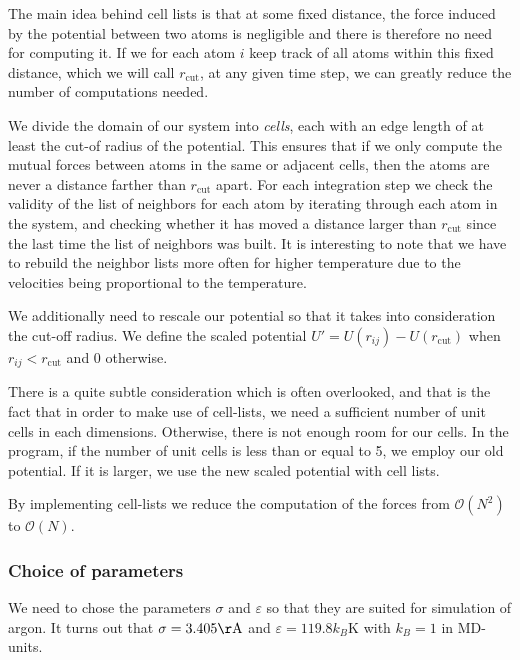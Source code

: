 \documentclass[a4paper]{article}
\begin{document}
    The main idea behind cell lists is that at some fixed distance, the force
    induced by the potential between two atoms is negligible and there is
    therefore no need for computing it. If we for each atom $i$ keep track of
    all atoms within this fixed distance, which we will call $r_\mathrm{cut}$,
    at any given time step, we can greatly reduce the number of computations
    needed. 

    We divide the domain of our system into \emph{cells}, each with an edge
    length of at least the cut-of radius of the potential. This ensures that if
    we only compute the mutual forces between atoms in the same or adjacent
    cells, then the atoms are never a distance farther than $r_\mathrm{cut}$
    apart. For each integration step we check the validity of the list of
    neighbors for each atom by iterating through each atom in the system, and
    checking whether it has moved a distance larger than $r_\mathrm{cut}$ since
    the last time the list of neighbors was built. It is interesting to note
    that we have to rebuild the neighbor lists more often for higher
    temperature due to the velocities being proportional to the temperature.
   
    We additionally need to rescale our potential so that it takes into
    consideration the cut-off radius. We define the scaled potential $U' =
    U(r_{ij}) - U(r_\mathrm{cut})$ when $r_{ij} < r_\mathrm{cut}$ and 0
    otherwise.
    
    There is a quite subtle consideration which is often overlooked, and that
    is the fact that in order to make use of cell-lists, we need a sufficient
    number of unit cells in each dimensions. Otherwise, there is not enough
    room for our cells.  In the program, if the number of unit cells is less
    than or equal to 5, we employ our old potential. If it is larger, we use
    the new scaled potential with cell lists.

    By implementing cell-lists we reduce the computation of the forces from
    $\mathcal{O}(N^2)$ to $\mathcal{O}(N)$. 
   
    \subsubsection{Choice of parameters}
    \label{ssub:choice_of_parameters}
    
    We need to chose the parameters $\sigma$ and $\varepsilon$ so that they are
    suited for simulation of argon. It turns out that $\sigma = 3.405
    \mathrm{\AA}$ and $\varepsilon = 119.8k_B\mathrm{K}$ with $k_B = 1$ in
    MD-units.
\end{document}
